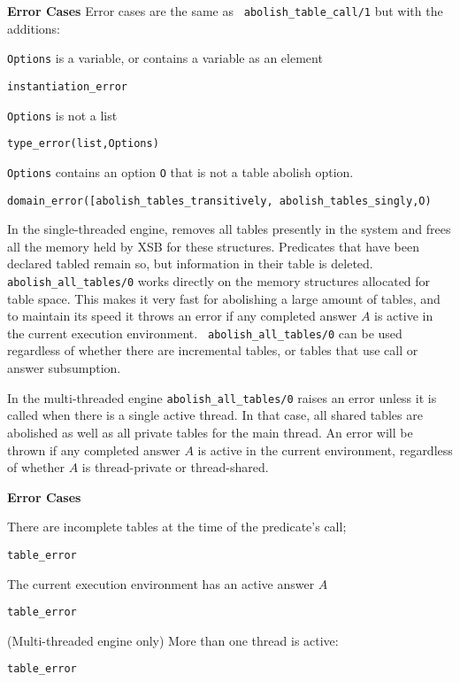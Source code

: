 \begin{description}
\begin{description}
{\bf Error Cases} Error cases are the same as {\tt
  abolish\_table\_call/1} but with the additions: 
\bi
\item {\tt Options} is a variable, or contains a variable as an element
\bi
\item {\tt instantiation\_error}
\ei
\item {\tt Options} is not a list
\bi
\item {\tt type\_error(list,Options)}
\ei
\item {\tt Options} contains an option {\tt O} that is not a
  table abolish option.
\bi
\item {\tt domain\_error([abolish\_tables\_transitively, abolish\_tables\_singly,O)}
\ei
\ei




%
In the single-threaded engine, removes all tables presently in the
system and frees all the memory held by XSB for these structures.
Predicates that have been declared tabled remain so, but information
in their table is deleted.  {\tt abolish\_all\_tables/0} works
directly on the memory structures allocated for table space.  This
makes it very fast for abolishing a large amount of tables, and to
maintain its speed it throws an error if any completed answer $A$ is
active in the current execution environment.  {\tt
  abolish\_all\_tables/0} can be used regardless of whether there are
incremental tables, or tables that use call or answer subsumption.

In the multi-threaded engine {\tt abolish\_all\_tables/0} raises an
error unless it is called when there is a single active thread.  In
that case, all shared tables are abolished as well as all private
tables for the main thread.  An error will be thrown if any completed
answer $A$ is active in the current environment, regardless of whether
$A$ is thread-private or thread-shared.  



{\bf Error Cases}
\bi
\item There are incomplete tables at the time of the predicate's call;
\bi
\item 	{\tt table\_error}
\ei
\item The current execution environment has an active answer $A$
\bi
\item 	{\tt table\_error}
\ei
\item (Multi-threaded engine only) More than one thread is active:
\bi
\item 	{\tt table\_error}
\ei
%
%
\ei


\end{description}
\end{description}
